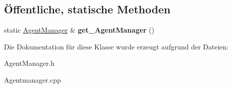 \subsection*{Öffentliche, statische Methoden}
\begin{DoxyCompactItemize}
\item 
\hypertarget{class_agent_manager_a1af0e6f1ed0b2b4db25617f4e9357e81}{static \hyperlink{class_agent_manager}{Agent\-Manager} \& {\bfseries get\-\_\-\-Agent\-Manager} ()}\label{class_agent_manager_a1af0e6f1ed0b2b4db25617f4e9357e81}

\end{DoxyCompactItemize}


Die Dokumentation für diese Klasse wurde erzeugt aufgrund der Dateien\-:\begin{DoxyCompactItemize}
\item 
Agent\-Manager.\-h\item 
Agentmanager.\-cpp\end{DoxyCompactItemize}
